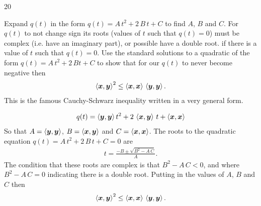 \documentclass{sotonExamBoxes}    %
\begin{document}
\begin{question}{20}
\begin{qparts}
{      Expand $q(t)$ in the form $q(t) = A\,t^2 + 2\, B \, t +C$ to       
      find $A$, $B$ and $C$.  For $q(t)$ to not change sign its roots
      (values of $t$ such that $q(t)=0$) must be complex (i.e. have an
      imaginary part), or possible have a double root. if there is a
      value of $t$ such that $q(t)=0$.  Use the
      standard solutions to a quadratic of the form $q(t) = A\,t^2 +
      2\, B t + C$ to show that for our $q(t)$ to never become
      negative then
      \begin{align*}
        \left\langle \bm{x}, \bm{y}\right\rangle^2 \leq \left\langle \bm{x}, \bm{x}\right\rangle \,
        \left\langle \bm{y}, \bm{y}\right\rangle.
      \end{align*}
      This is the famous Cauchy-Schwarz inequality written in a very
      general form.}{}
    \begin{answer}
      \begin{align*}
        q(t) = \left\langle \bm{y}, \bm{y}\right\rangle  t^2 + 2\,
        \left\langle \bm{x}, \bm{y}\right\rangle\,t +  \left\langle \bm{x}, \bm{x}\right\rangle
      \end{align*}
      So that $A= \left\langle \bm{y}, \bm{y}\right\rangle$, $B= \left\langle \bm{x}, \bm{y}\right\rangle$
      and $C=\left\langle \bm{x}, \bm{x}\right\rangle$.  The roots to the quadratic
      equation $q(t)=A\,t^2 + 2\, B \, t + C = 0$ are
      \begin{align*}
        t = \frac{-B \pm \sqrt{B^2 - A\,C}}{A}.
      \end{align*}
      The condition that these roots are complex is that $B^2-A\,C<0$,
      and where $B^2-A\,C=0$ indicating there is a double root.
      Putting in the values of $A$, $B$ and $C$ then
      \begin{align*}
          \left\langle \bm{x}, \bm{y}\right\rangle^2 \leq \left\langle \bm{x}, \bm{x}\right\rangle \,
        \left\langle \bm{y}, \bm{y}\right\rangle.
      \end{align*}
    \end{answer}
    \freshpage
    \begin{answer}

\end{answer}
\end{qparts}
\end{question}
\end{document}
